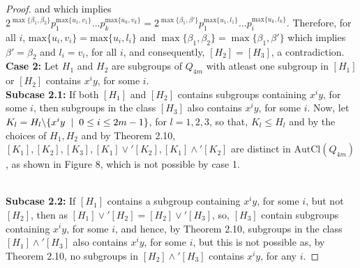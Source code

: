 \documentclass{article}
\theoremstyle{definition}
\begin{document}
\begin{proof}
and which implies $2^{\max\{\beta_1,\beta_2\}}p_1^{\text{max}\{u_1,v_1\}}\dots p_k^{\text{max}\{u_k,v_k\}}=2^{\max\{\beta_1,\beta'\}}p_1^{\text{max}\{u_1,l_1\}}\dots p_i^{\text{max}\{u_k,l_k\}}$. Therefore, for all $i$, $\text{max}\{u_i,v_i\}=\text{max}\{u_i,l_i\}$ and $\max\{\beta_1,\beta_2\}=\max\{\beta_1,\beta'\}$ which implies $\beta'=\beta_2$ and $l_i=v_i$, for all $i$, and consequently, $[H_2]=[H_3]$, a contradiction.\vspace{0.2cm}\\
\textbf{Case 2:} Let $H_1$ and $H_2$ are subgroups of $Q_{4m}$ with atleast one subgroup in $[H_1]$ or $[H_2]$ contains $x^iy$, for some $i$. \vspace{0.2cm}\\
\textbf{Subcase 2.1:} If both $[H_1]$ and $[H_2]$ contains subgroups containing $x^iy$, for some $i$, then subgroups in the class $[H_3]$ also contains $x^iy$, for some $i$. Now, let $K_l=H_l\backslash\{x^iy\hspace{0.2cm}|\hspace{0.2cm}0\le i\le 2m-1\}$, for $l=1,2,3$, so that, $K_l\le H_l$ and by the choices of $H_1,H_2$ and by Theorem 2.10, $[K_1], [K_2],[K_3],[K_1]\vee' [K_2],[K_1]\wedge' [K_2]$ are distinct in $\text{AutCl}(Q_{4m})$, as shown in Figure 8, which is not possible by case 1. 
\begin{figure}[h]
    \centering
        \caption{}
\end{figure}\\
\textbf{Subcase 2.2:} If $[H_1]$ contains a subgroup containing $x^iy$, for some $i$, but not $[H_2]$, then as $[H_1]\vee'[H_2]=[H_2]\vee'[H_3]$, so, $[H_3]$ contain subgroups containing $x^iy$, for some $i$, and hence, by Theorem 2.10, subgroups in the class $[H_1]\wedge'[H_3]$ also contains $x^iy$, for some $i$, but this is not possible as, by Theorem 2.10, no subgroups in $[H_2]\wedge'[H_3]$ contains $x^iy$, for any $i$.
    \end{proof}
\end{document}

